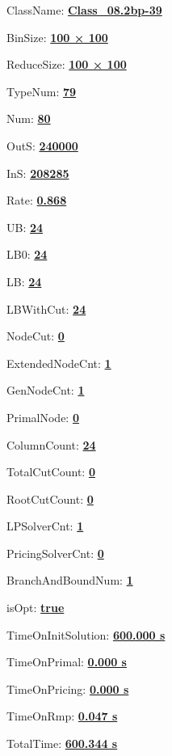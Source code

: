 \documentclass[11pt]{article}
\begin{document}
\pagestyle{empty}


ClassName: \underline{\textbf{Class_08.2bp-39}}
\par
BinSize: \underline{\textbf{100 × 100}}
\par
ReduceSize: \underline{\textbf{100 × 100}}
\par
TypeNum: \underline{\textbf{79}}
\par
Num: \underline{\textbf{80}}
\par
OutS: \underline{\textbf{240000}}
\par
InS: \underline{\textbf{208285}}
\par
Rate: \underline{\textbf{0.868}}
\par
UB: \underline{\textbf{24}}
\par
LB0: \underline{\textbf{24}}
\par
LB: \underline{\textbf{24}}
\par
LBWithCut: \underline{\textbf{24}}
\par
NodeCut: \underline{\textbf{0}}
\par
ExtendedNodeCnt: \underline{\textbf{1}}
\par
GenNodeCnt: \underline{\textbf{1}}
\par
PrimalNode: \underline{\textbf{0}}
\par
ColumnCount: \underline{\textbf{24}}
\par
TotalCutCount: \underline{\textbf{0}}
\par
RootCutCount: \underline{\textbf{0}}
\par
LPSolverCnt: \underline{\textbf{1}}
\par
PricingSolverCnt: \underline{\textbf{0}}
\par
BranchAndBoundNum: \underline{\textbf{1}}
\par
isOpt: \underline{\textbf{true}}
\par
TimeOnInitSolution: \underline{\textbf{600.000 s}}
\par
TimeOnPrimal: \underline{\textbf{0.000 s}}
\par
TimeOnPricing: \underline{\textbf{0.000 s}}
\par
TimeOnRmp: \underline{\textbf{0.047 s}}
\par
TotalTime: \underline{\textbf{600.344 s}}
\par
\newpage


\end{document}
